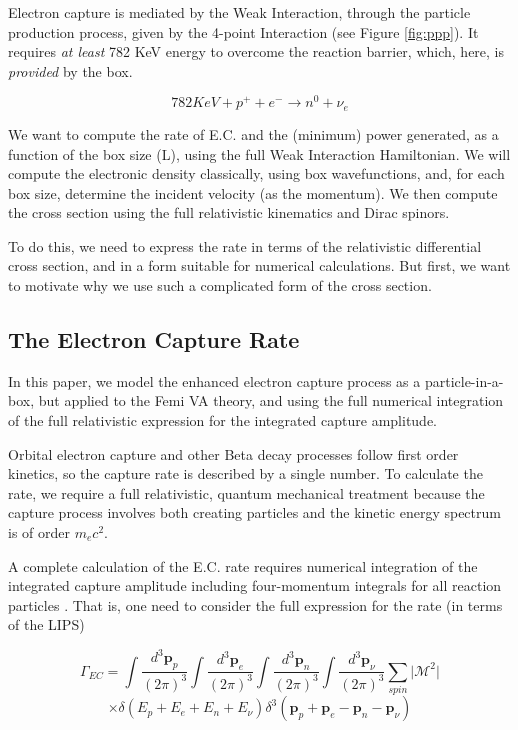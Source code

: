 \documentclass[%
 aip,
 jmp,%
 amsmath,amssymb,
 reprint,%
]{revtex4-1}
\begin{document}
Electron capture is mediated by the Weak Interaction, through the particle production process, given by the 4-point Interaction (see Figure \ref{fig:ppp}).   It requires \emph{at least} 782 KeV energy to overcome the reaction barrier, which, here, is \emph{provided} by the box. 

$$782{KeV}+p^{+}+e^{-}\rightarrow n^{0}+\nu_{e}$$  

We want to compute the rate of E.C. and the (minimum) power generated, as a function of the box size (L), using the full Weak Interaction Hamiltonian.   We will compute the electronic density classically, using box wavefunctions, and, for each box size, determine the incident velocity (as the momentum). We then compute the cross section using the full relativistic kinematics and Dirac spinors.  

To do this, we need to express the rate in terms of the relativistic differential cross section, and in a form suitable for numerical calculations.  
But first, we want to motivate why we use such a complicated form of the cross section.

\subsection{The Electron Capture Rate}

In this paper, we model the enhanced electron capture process as a particle-in-a-box, but applied to the Femi VA theory, and using the full numerical integration of the full relativistic expression for the integrated capture amplitude.


Orbital electron capture and other Beta decay processes follow first order kinetics, so the capture rate is described by a single number. 
To calculate the rate, we require a full relativistic, quantum mechanical treatment because the capture process involves both creating particles and the kinetic energy spectrum is of order $m_{e}c^{2}$.

A complete calculation of the E.C. rate requires numerical integration of  the integrated capture amplitude including four-momentum integrals for all reaction particles \cite{liu}. That is, one need to consider the full expression for the rate (in terms of the LIPS)

$$\Gamma_{EC}=\int\dfrac{d^{3}\mathbf{p}_{p}}{(2\pi)^{3}}\int\dfrac{d^{3}\mathbf{p}_{e}}{(2\pi)^{3}}\int\dfrac{d^{3}\mathbf{p}_{n}}{(2\pi)^{3}}\int\dfrac{d^{3}\mathbf{p}_{\nu}}{(2\pi)^{3}}\sum\limits_{spin}\vert\mathcal{M}^{2}\vert$$
$$\times\delta(E_{p}+E_{e}+E_{n}+E_{\nu})\delta^{3}(\mathbf{p}_{p}+\mathbf{p}_{e}-\mathbf{p}_{n}-\mathbf{p}_{\nu})$$
\end{document}
